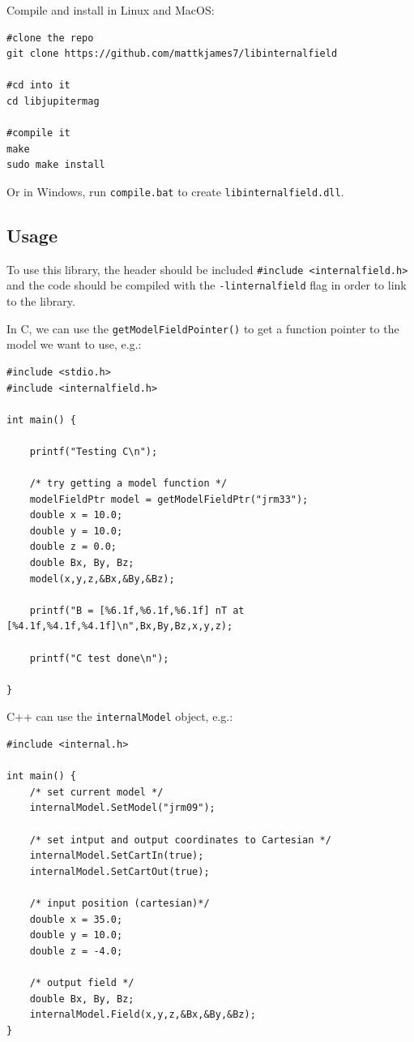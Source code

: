 			Compile and install in Linux and MacOS:

			\begin{verbatim}
#clone the repo
git clone https://github.com/mattkjames7/libinternalfield
		
#cd into it
cd libjupitermag
			
#compile it
make
sudo make install
			\end{verbatim}

			Or in Windows, run \texttt{compile.bat} to create \texttt{libinternalfield.dll}.

		\subsection{Usage}

			To use this library, the header should be included \texttt{#include <internalfield.h>} and the code should be compiled with the \texttt{-linternalfield} flag in order to link to the library.

			In C, we can use the \texttt{getModelFieldPointer()} to get a function pointer to the model we want to use, e.g.:
			\begin{verbatim}
#include <stdio.h>
#include <internalfield.h>

int main() {

	printf("Testing C\n");
	
	/* try getting a model function */
	modelFieldPtr model = getModelFieldPtr("jrm33");
	double x = 10.0;
	double y = 10.0;
	double z = 0.0;
	double Bx, By, Bz;
	model(x,y,z,&Bx,&By,&Bz);

	printf("B = [%6.1f,%6.1f,%6.1f] nT at [%4.1f,%4.1f,%4.1f]\n",Bx,By,Bz,x,y,z);

	printf("C test done\n");

}
			\end{verbatim}

			C++ can use the \texttt{internalModel} object, e.g.:
			\begin{verbatim}
#include <internal.h>

int main() {
    /* set current model */
    internalModel.SetModel("jrm09");

    /* set intput and output coordinates to Cartesian */
    internalModel.SetCartIn(true);
    internalModel.SetCartOut(true);

    /* input position (cartesian)*/
    double x = 35.0;
    double y = 10.0;
    double z = -4.0;

    /* output field */
    double Bx, By, Bz;
    internalModel.Field(x,y,z,&Bx,&By,&Bz);    
}
			\end{verbatim}


